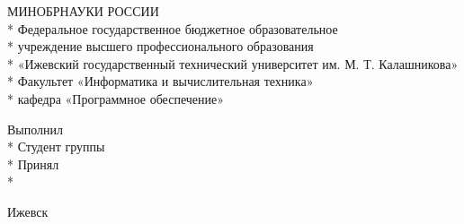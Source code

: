 \begin{titlepage}
\newpage

\begin{center}
МИНОБРНАУКИ РОССИИ\\*
Федеральное государственное бюджетное образовательное\\*
учреждение высшего профессионального образования\\*
«Ижевский государственный технический университет им. М. Т. Калашникова»\\*
Факультет «Информатика и вычислительная техника»\\*
кафедра «Программное обеспечение»
\vspace{1cm}
\end{center}

\vspace{8em}

\begin{center}
\titletext
\end{center}

\vspace{2.5em}

\vspace{6em}

\begin{flushleft}
    Выполнил\\*
    Студент группы \mygroup \hfill \myname\\*
    \vspace{1.5em}
    Принял \hfill \teacher\\*
\end{flushleft}

\vspace{\fill}

\begin{center}
    Ижевск \myyear
\end{center}

\end{titlepage}

